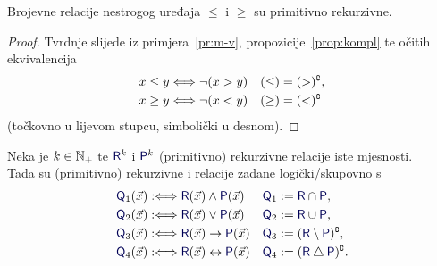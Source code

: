 \begin{korolar}[{name=[primitivna rekurzivnost relacija nestrogog uređaja]}]\label{kor:mj-vj}
Brojevne relacije nestrogog uređaja $\le$ i $\ge$ su primitivno rekurzivne.
\end{korolar}
\begin{proof}
Tvrdnje slijede iz primjera~\ref{pr:m-v}, propozicije~\ref{prop:kompl} te očitih ekvivalencija
\begin{align}
    x\le y&\Longleftrightarrow\lnot(x>y) & (\le) &= (>)\sp{{\scriptscriptstyle\complement}}\text,\\
    x\ge y&\Longleftrightarrow\lnot(x<y) & (\ge) &= (<)\sp{{\scriptscriptstyle\complement}}
\end{align}
(točkovno u lijevom stupcu, simbolički u desnom).
\end{proof}

\begin{propozicija}[{name=[logički veznici čuvaju (primitivnu) rekurzivnost]}]\label{prop:vezn}
Neka je $k\in{\mathbb N}_+$ te $\f R^k$ i $\f P^k$ (primitivno) rekurzivne relacije iste mjesnosti.\\ Tada su (primitivno) rekurzivne i relacije zadane logički\slash skupovno s
\begin{align}
    \f Q_1(\vec x)&:\Longleftrightarrow\f R(\vec x)\land\f P(\vec x)
    &
    \f Q_1 &:=\f R \cap\f P\text,
    \\
    \f Q_2(\vec x)&:\Longleftrightarrow\f R(\vec x)\lor\f P(\vec x)
    &
    \f Q_2 &:=\f R \cup\f P\text,
    \\
    \f Q_3(\vec x)&:\Longleftrightarrow\f R(\vec x)\to\f P(\vec x)
    &
    \f Q_3 &:=(\f R\setminus\f P)\kompl\text,
    \\
    \f Q_4(\vec x)&:\Longleftrightarrow\f R(\vec x)\leftrightarrow\f P(\vec x)
    &
    \f Q_4 &:=(\f R\mathbin\triangle\f P)\kompl\text.
\end{align}
\end{propozicija}
